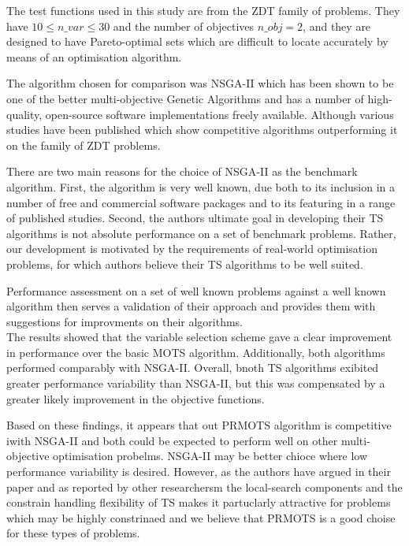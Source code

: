 \documentclass[pdftex,11pt]{article}
\begin{document}
The test functions used in this study are from the ZDT family of problems. They have $10 \leq n\_var \leq 30$ and the number of objectives $n\_obj=2$, and they are designed to have Pareto-optimal sets which are difficult to locate accurately by means of an optimisation algorithm.

The algorithm chosen for comparison was NSGA-II which has been shown to be one of the better multi-objective Genetic Algorithms and has a number of high-quality, open-source software implementations freely available. Although various studies have been published which show competitive algorithms outperforming it on the family of ZDT problems. 

There are two main reasons for the choice of NSGA-II as the benchmark algorithm. First, the algorithm is very well known, due both to its inclusion in a number of free and commercial software packages and to its featuring in a range of published studies. Second, the authors ultimate goal in developing their TS algorithms is not absolute performance on a set of benchmark problems. Rather, our development is motivated by the requirements of real-world optimisation problems, for which authors believe their TS algorithms to be well suited.

Performance assessment on a set of well known problems against a well known algorithm then serves a validation of their approach and provides them with suggestions for improvments on their algorithms.\\

The results showed that the variable selection scheme gave a clear improvement in performance over the basic MOTS algorithm. Additionally, both algorithms performed comparably with NSGA-II. Overall, bnoth TS algorithms exibited greater performance variability than NSGA-II, but this was compensated by a greater likely improvement in the objective functions.

Based on these findings, it appears that out PRMOTS algorithm is competitive iwith NSGA-II and both could be expected to perform well on other multi-objective optimisation probelms. NSGA-II may be better chioce where low performance variability is desired. However, as the authors have argued in their paper and as reported by other researchersm the local-search components and the constrain handling flexibility of TS makes it partuclarly attractive for problems which may be highly constrinaed and we believe that PRMOTS is a good choise for these types of problems.
\end{document}

